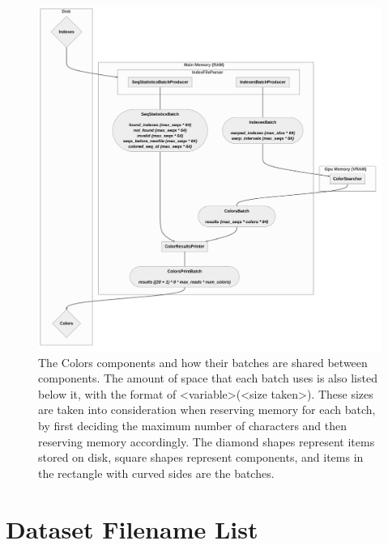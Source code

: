 \begin{figure}[h!]
  \centering
  \includegraphics[width=\textwidth]{images/ColorBatches.png}
  \caption{The Colors components and how their batches are shared between components. The amount of space that each batch uses is also listed below it, with the format of <variable>(<size taken>). These sizes are taken into consideration when reserving memory for each batch, by first deciding the maximum number of characters and then reserving memory accordingly. The diamond shapes represent items stored on disk, square shapes represent components, and items in the rectangle with curved sides are the batches.}\label{fig:ColorBatches}
\end{figure}

\clearpage
\section{Dataset Filename List}\label{app:file_names}

